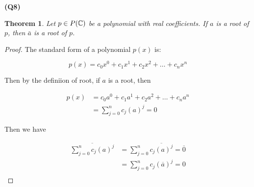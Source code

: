 \documentclass[12pt, a4paper]{article}
\newtheorem*{theorem}{Theorem}
\begin{document}
\textbf{(Q8)}

\begin{theorem}
    Let $p \in P(\mathbb{C})$ be a polynomial with real coefficients. If $a$
    is a root of $p$, then $\bar{a}$ is a root of $p$.
\end{theorem}

\begin{proof}
    The standard form of a polynomial $p(x)$ is:

    \[
        p(x) = c_0x^0 + c_1x^1 + c_2x^2 + \ldots + c_nx^n
    \]

    Then by the definiion of root, if $a$ is a root, then

    \begin{align*}
        p(x) & = c_0a^0 + c_1a^1 + c_2a^2 + \ldots + c_na^n\\
        & = \sum_{j = 0}^{n} c_j(a)^j = 0
    \end{align*}

    Then we have

    \begin{align*}
        \overline{\sum_{j = 0}^{n} c_j(a)^j} & = 
        \sum_{j = 0}^{n} \overline{c_j(a)^j} = \overline{0}\\
        & = \sum_{j = 0}^{n} c_j(\overline{a})^j = 0\\
    \end{align*}
\end{proof}
\end{document}
